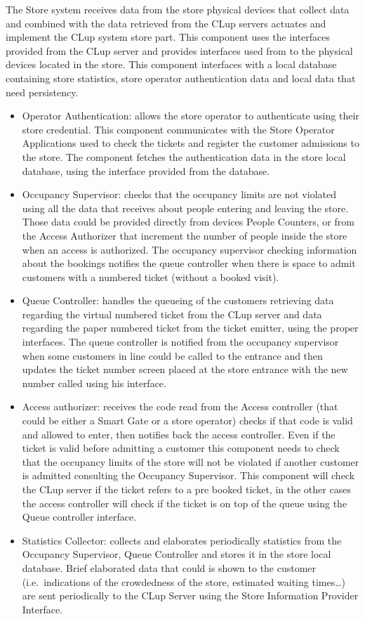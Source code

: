 The Store system receives data from the store physical devices that collect data and combined with the data retrieved from the CLup servers actuates and implement the CLup system store part. This component uses the interfaces provided from the CLup server and provides interfaces used from to the physical devices located in the store. This component interfaces with a local database containing store statistics, store operator authentication data and local data that need persistency.

\begin{itemize}
    \item Operator Authentication: allows the store operator to authenticate using their store credential. This component communicates with the Store Operator Applications used to check the tickets and register the customer admissions to the store. The component fetches the authentication data in the store local database, using the interface provided from the database.
    \item Occupancy Supervisor: checks that the occupancy limits are not violated using all the data that receives about people entering and leaving the store. Those data could be provided directly from devices People Counters, or from the Access Authorizer that increment the number of people inside the store when an access is authorized. The occupancy supervisor checking information about the bookings notifies the queue controller when there is space to admit customers with a numbered ticket (without a booked visit).
    \item Queue Controller: handles the queueing of the customers retrieving data regarding the virtual numbered ticket from the CLup server and data regarding the paper numbered ticket from the ticket emitter, using the proper interfaces. The queue controller is notified from the occupancy supervisor when some customers in line could be called to the entrance and then updates the ticket number screen placed at the store entrance with the new number called using his interface.
    \item Access authorizer: receives the code read from the Access controller (that could be either a Smart Gate or a store operator) checks if that code is valid and allowed to enter, then notifies back the access controller. Even if the ticket is valid before admitting a customer this component needs to check that the occupancy limits of the store will not be violated if another customer is admitted consulting the Occupancy Supervisor. This component will check the CLup server if the ticket refers to a pre booked ticket, in the other cases the access controller will check if the ticket is on top of the queue using the Queue controller interface. 
    \item Statistics Collector: collects and elaborates periodically statistics from the Occupancy Supervisor, Queue Controller and stores it in the store local database. Brief elaborated data that could is shown to the customer (i.e.~indications of the crowdedness of the store, estimated waiting times\ldots) are sent periodically to the CLup Server using the Store Information Provider Interface.  
\end{itemize}
